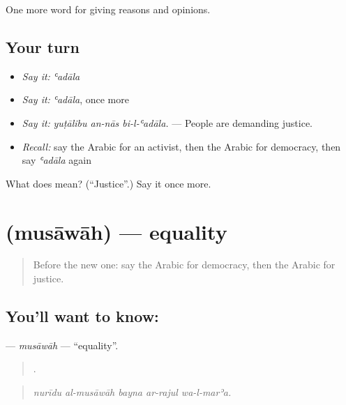 \begin{grammarlens}[title={What you've built}]
One more word for giving reasons and opinions.
\end{grammarlens}

\subsection*{Your turn}
\begin{itemize}
\raggedright
  \item \emph{Say it:} \emph{ʿadāla}
  \item \emph{Say it:} \emph{ʿadāla}, once more
  \item \emph{Say it:} \emph{yuṭālibu an-nās bi-l-ʿadāla.} — People are demanding justice.
  \item \emph{Recall:} say the Arabic for an activist, then the Arabic for democracy, then say \emph{ʿadāla} again
\end{itemize}

\begin{tcolorbox}[breakable,colback=teal!4,colframe=teal!35!black,title={Before you move on}]
What does  mean? (\textquotedblleft{}Justice\textquotedblright{}.) Say it once more.
\end{tcolorbox}
\section[\texorpdfstring{\ar{مساواة} (musāwāh)}{مساواة (musāwāh)}]{ (musāwāh) — equality}

\label{lesson:AR-C380-musawah}



\begin{quote}
Before the new one: say the Arabic for democracy, then the Arabic for justice.
\end{quote}

\subsection*{You'll want to know: }
\textbf{} — \emph{musāwāh} — \textquotedblleft{}equality\textquotedblright{}.

\begin{quote}
    .
\end{quote}

\begin{quote}
\emph{nurīdu al-musāwāh bayna ar-rajul wa-l-marʾa.}
\end{quote}


